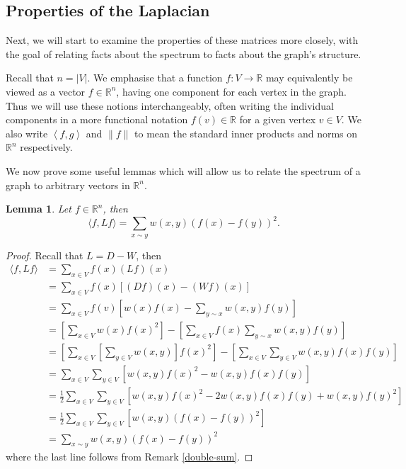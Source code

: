 \documentclass[a4paper,11pt]{article}
\newtheorem{lemma}[theorem]{Lemma}
\theoremstyle{definition}
\newcommand{\R}{\mathbb{R}}
\newcommand{\inner}[2]{\left\langle #1, #2 \right\rangle}
\begin{document}
\subsection{Properties of the Laplacian}
Next, we will start to examine the properties of these matrices more closely, with the goal of relating facts about the spectrum to facts about the graph's structure.

\medskip

Recall that $n = |V|$. We emphasise that a function $f: V \to \R$ may equivalently be viewed as a vector $f \in \R^n$, having one component for each vertex in the graph. Thus we will use these notions interchangeably, often writing the individual components in a more functional notation $f(v) \in \R$ for a given vertex $v \in V$. We also write $\inner{f}{g}$ and $\|f\|$ to mean the standard inner products and norms on $\R^n$ respectively.

\medskip

We now prove some useful lemmas which will allow us to relate the spectrum of a graph to arbitrary vectors in $\R^n$.

\begin{lemma}\label{quadratic-form}
Let $f \in \R^n$, then \[\langle f, L f \rangle = \sum_{x \sim y} w(x, y)(f(x) - f(y))^2.\]
\end{lemma}
\begin{proof}
Recall that $L = D - W$, then
\begin{align*}
\langle f, Lf \rangle &= \sum_{x \in V} f(x)(Lf)(x) \\
&= \sum_{x \in V} f(x)\left[(Df)(x) - (Wf)(x)\right] \\
&= \sum_{x \in V} f(v)\left[w(x)f(x) - \sum_{y \sim x}w(x, y)f(y)\right] \\
&= \left[\sum_{x \in V} w(x)f(x)^2\right] - \left[\sum_{x \in V} f(x) \sum_{y \sim x}w(x, y)f(y)\right] \\
&= \left[\sum_{x \in V} \left[\sum_{y \in V}w(x, y)\right]f(x)^2\right] - \left[\sum_{x \in V} \sum_{y \in V}w(x, y)f(x)f(y)\right] \\
&= \sum_{x \in V}\sum_{y \in V}\left[w(x, y)f(x)^2 - w(x, y)f(x)f(y)\right] \\
&= \frac{1}{2}\sum_{x \in V}\sum_{y \in V}\left[w(x, y)f(x)^2 - 2w(x, y)f(x)f(y) + w(x, y)f(y)^2\right] \\
&= \frac{1}{2}\sum_{x \in V}\sum_{y \in V}\left[w(x, y)(f(x) - f(y))^2\right] \\
&= \sum_{x \sim y} w(x, y)(f(x) - f(y))^2
\end{align*}
where the last line follows from Remark \ref{double-sum}.
\end{proof}
\end{document}
